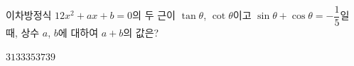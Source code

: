 이차방정식 $12x^2+ax+b=0$의 두 근이 $\tan\theta$, $\cot\theta$이고 $\sin\theta+\cos\theta=-\dfrac{1}{5}$일 때, 상수 $a$, $b$에 대하여 $a+b$의 값은?
\begin{choices32}{$31$}{$33$}{$35$}{$37$}{$39$}\end{choices32}
